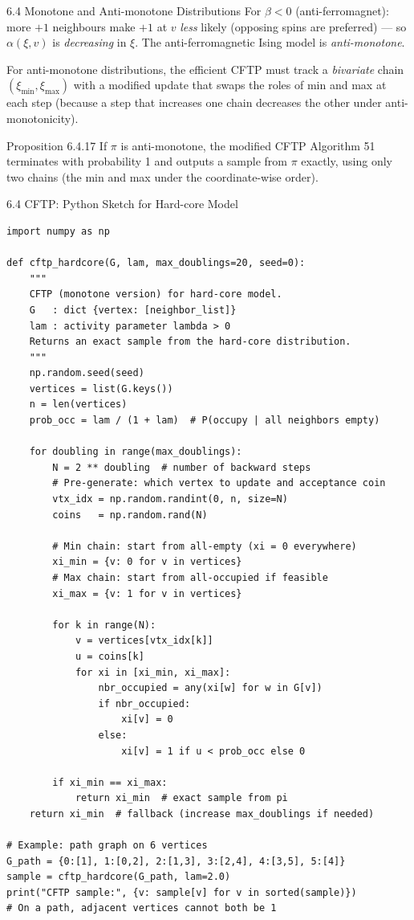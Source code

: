 \documentclass[aspectratio=169,10pt]{beamer}
\begin{document}
\begin{frame}[allowframebreaks]{6.4 Monotone and Anti-monotone Distributions}
For $\beta < 0$ (anti-ferromagnet): more $+1$ neighbours make $+1$ at $v$ \emph{less} likely (opposing spins are preferred) --- so $\alpha(\xi,v)$ is \emph{decreasing} in $\xi$.
The anti-ferromagnetic Ising model is \emph{anti-monotone}.

For anti-monotone distributions, the efficient CFTP must track a \emph{bivariate} chain $(\xi_{\min}, \xi_{\max})$ with a modified update that swaps the roles of min and max at each step (because a step that increases one chain decreases the other under anti-monotonicity).

\begin{block}{Proposition 6.4.17}
If $\pi$ is anti-monotone, the modified CFTP Algorithm 51 terminates with probability 1 and outputs a sample from $\pi$ exactly, using only two chains (the min and max under the coordinate-wise order).
\end{block}

\end{frame}

\begin{frame}[fragile]{6.4 CFTP: Python Sketch for Hard-core Model}
\begin{lstlisting}[style=python]
import numpy as np

def cftp_hardcore(G, lam, max_doublings=20, seed=0):
    """
    CFTP (monotone version) for hard-core model.
    G   : dict {vertex: [neighbor_list]}
    lam : activity parameter lambda > 0
    Returns an exact sample from the hard-core distribution.
    """
    np.random.seed(seed)
    vertices = list(G.keys())
    n = len(vertices)
    prob_occ = lam / (1 + lam)  # P(occupy | all neighbors empty)

    for doubling in range(max_doublings):
        N = 2 ** doubling  # number of backward steps
        # Pre-generate: which vertex to update and acceptance coin
        vtx_idx = np.random.randint(0, n, size=N)
        coins   = np.random.rand(N)

        # Min chain: start from all-empty (xi = 0 everywhere)
        xi_min = {v: 0 for v in vertices}
        # Max chain: start from all-occupied if feasible
        xi_max = {v: 1 for v in vertices}

        for k in range(N):
            v = vertices[vtx_idx[k]]
            u = coins[k]
            for xi in [xi_min, xi_max]:
                nbr_occupied = any(xi[w] for w in G[v])
                if nbr_occupied:
                    xi[v] = 0
                else:
                    xi[v] = 1 if u < prob_occ else 0

        if xi_min == xi_max:
            return xi_min  # exact sample from pi
    return xi_min  # fallback (increase max_doublings if needed)

# Example: path graph on 6 vertices
G_path = {0:[1], 1:[0,2], 2:[1,3], 3:[2,4], 4:[3,5], 5:[4]}
sample = cftp_hardcore(G_path, lam=2.0)
print("CFTP sample:", {v: sample[v] for v in sorted(sample)})
# On a path, adjacent vertices cannot both be 1
\end{lstlisting}
\end{frame}
\end{document}
